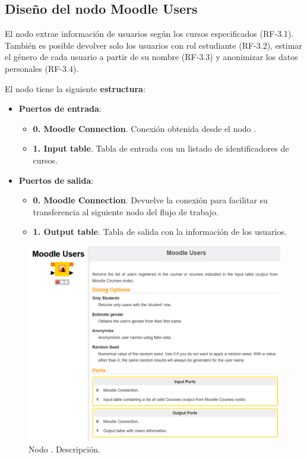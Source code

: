 \newpage
\subsection{Diseño del nodo Moodle Users}

El nodo  extrae información de usuarios según los cursos especificados (RF-3.1). 
También es posible devolver solo los usuarios con rol estudiante (RF-3.2), estimar el género de cada
usuario a partir de su nombre (RF-3.3) y anonimizar los datos personales (RF-3.4). 
\

El nodo tiene la siguiente \textbf{estructura}:

\begin{itemize}
	\item \textbf{Puertos de entrada}: 
    \begin{itemize}
		\item \textbf{0. Moodle Connection}. Conexión obtenida desde el nodo . 
		\item \textbf{1. Input table}. Tabla de entrada con un listado de identificadores de cursos. 
   	\end{itemize}

	\item \textbf{Puertos de salida}: 
    \begin{itemize}
		\item \textbf{0. Moodle Connection}. Devuelve la conexión para facilitar su transferencia al siguiente nodo del flujo de trabajo. 
		\item \textbf{1. Output table}. Tabla de salida con la información de los usuarios. 
   	\end{itemize}

\end{itemize}


\begin{figure}[!h]
	\centering
	\includegraphics[width=1\textwidth]{img/nodes_moodle_users.png}
	\caption{Nodo . Descripción.}
	\label{fig:moodleusers}
\end{figure}
\FloatBarrier



